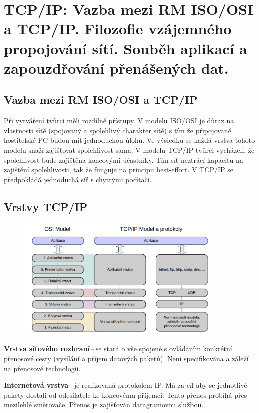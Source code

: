 \section{TCP/IP: Vazba mezi RM ISO/OSI a TCP/IP. Filozofie vzájemného propojování sítí. Souběh aplikací a zapouzdřování přenášených dat.}

\subsection{Vazba mezi RM ISO/OSI a TCP/IP}

Při vytváření tvůrci měli rozdílné přístupy.
V modelu ISO/OSI je důraz na vlastnosti sítě (spojovaný a spolehlivý charakter sítě) s tím že připojované hostitelské PC budou mít jednoduchou úlohu.
Ve výsledku se každá vrstva tohoto modelu snaží zajišťovat spolehlivost sama.
V modelu TCP/IP tvůrci vycházeli, že spolehlivost bude zajištěna koncovými účastníky.
Tím síť neztrácí kapacitu na zajištění spolehlivosti, tak že funguje na principu best-effort.
V TCP/IP se předpokládá jednoduchá síť s chytrými počítači.

\subsection{Vrstvy TCP/IP}

\begin{figure}[!h]
    \centering
    \includegraphics[width=0.9\textwidth]{obrazky/010.png}
\end{figure}

\textbf{Vrstva síťového rozhraní}\,--\,se stará o vše spojené s ovládáním konkrétní přenosové cesty (vysílání a příjem datových paketů).
Není specifikována a záleží na přenosové technologii.

\textbf{Internetová vrstva}\,--\,je realizovaná protokolem IP.
Má za cíl aby se jednotlivé pakety dostali od odesílatele ke koncovému příjemci.
Tento přenos probíhá přes mezilehlé směrovače.
Přenos je zajišťován datagramovou službou.


